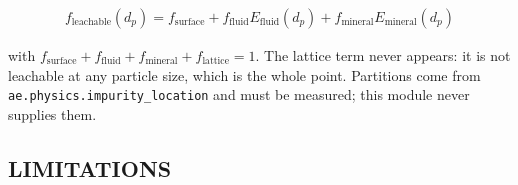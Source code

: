 \documentclass[10pt,a4paper,twoside]{report}
\begin{document}
\begin{equation*}
\begin{gathered}
f_{\text{leachable}}(d_p) = f_{\text{surface}} + f_{\text{fluid}} E_{\text{fluid}}(d_p) + f_{\text{mineral}} E_{\text{mineral}}(d_p)
\end{gathered}
\end{equation*}

with $f_{\text{surface}} + f_{\text{fluid}} + f_{\text{mineral}} + f_{\text{lattice}} = 1$. The lattice term never appears: it is not leachable at any particle size, which is the whole point. Partitions come from \texttt{ae.physics.impurity\_location} and must be measured; this module never supplies them.

\subsection*{LIMITATIONS}
\end{document}
